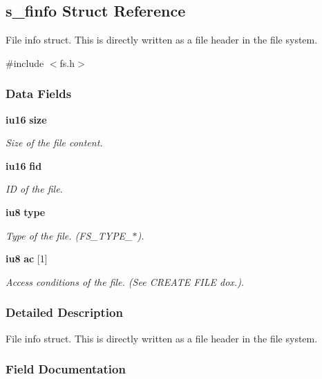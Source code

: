 \subsection{s\_\-finfo Struct Reference}
\label{structs__finfo}


File info struct. This is directly written as a file header in the file system.  




{\ttfamily \#include $<$fs.h$>$}

\subsubsection*{Data Fields}
\begin{DoxyCompactItemize}
\item 
{\bf iu16} {\bf size}
\begin{DoxyCompactList}\small\item\em Size of the file content. \item\end{DoxyCompactList}\item 
{\bf iu16} {\bf fid}
\begin{DoxyCompactList}\small\item\em ID of the file. \item\end{DoxyCompactList}\item 
{\bf iu8} {\bf type}
\begin{DoxyCompactList}\small\item\em Type of the file. (FS\_\-TYPE\_\-$\ast$). \item\end{DoxyCompactList}\item 
{\bf iu8} {\bf ac} [1]
\begin{DoxyCompactList}\small\item\em Access conditions of the file. (See CREATE FILE dox.). \item\end{DoxyCompactList}\end{DoxyCompactItemize}


\subsubsection{Detailed Description}
File info struct. This is directly written as a file header in the file system. 

\subsubsection{Field Documentation}
